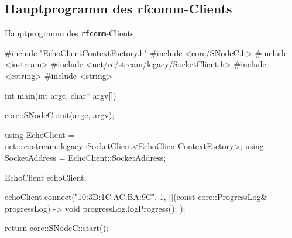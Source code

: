 \subsection{Hauptprogramm des rfcomm-Clients}

\begin{frame}[fragile]{Hauptprogramm des \texttt{rfcomm}-Clients}
  \begin{cppcode}[autogobble=true]
    #include "EchoClientContextFactory.h"
    #include <core/SNodeC.h>
    #include <iostream>
    #include <net/rc/stream/legacy/SocketClient.h>
    #include <cstring>
    #include <string>

    int main(int argc, char* argv[]) {
      core::SNodeC::init(argc, argv);

      using EchoClient = net::rc::stream::legacy::SocketClient<EchoClientContextFactory>;
      using SocketAddress = EchoClient::SocketAddress;

      EchoClient echoClient;

      echoClient.connect("10:3D:1C:AC:BA:9C", 1, [](const core::ProgressLog& progressLog) -> void {
        progressLog.logProgress();
      });

      return core::SNodeC::start();
    }
  \end{cppcode}
\end{frame}
